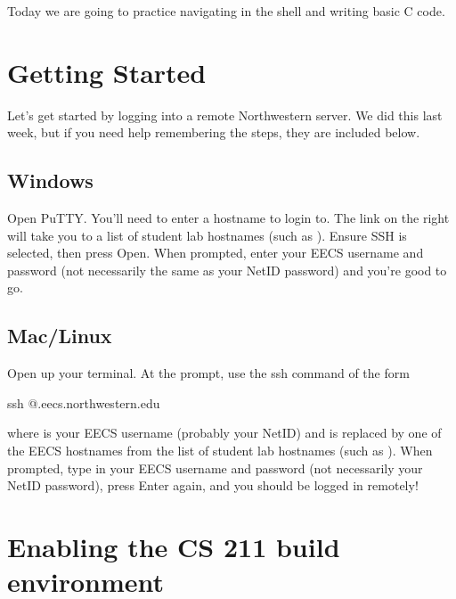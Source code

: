\documentclass{tufte-handout}
\begin{document}
\maketitle

Today we are going to practice navigating in the shell and writing basic
C code. 

\section{Getting Started}

Let's get started by logging into a remote Northwestern server. We did
this last week, but if you need help remembering the steps, they are
included below.

\subsection{Windows}

Open PuTTY. You'll need to enter a hostname to login to. The link on the
right will take you to a list of student lab hostnames (such as
).  Ensure SSH is selected, then
press Open. When prompted, enter your EECS username and password (not
necessarily the same as your NetID password) and you're good to go.

\subsection{Mac/Linux}

Open up your terminal. At the prompt, use the ssh command of the form

\begin{CmdLine*}
  \C ssh @.eecs.northwestern.edu\\
\end{CmdLine*}

\noindent where  is your EECS username (probably your
NetID) and  is replaced by one of the EECS hostnames
from the list of student lab hostnames (such as
). When prompted, type in your
EECS username and password (not necessarily your NetID password), press
Enter again, and you should be logged in remotely!

\section{Enabling the CS 211 build environment}
\end{document}
